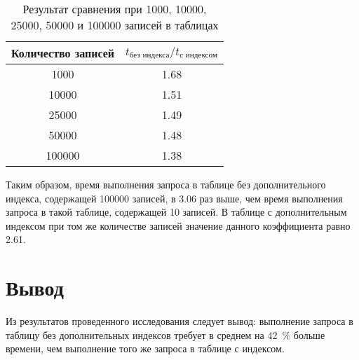 \begin{table}[h]
	\begin{center}
		\captionsetup{justification=raggedright,singlelinecheck=off}
		\caption{Результат сравнения при 1000, 10000, 25000, 50000 и 100000 записей в таблицах}
		\label{table:comparing}
		\begin{tabular}{|c|c|}
			\hline
			Количество записей & $t_{\text{без индекса}} / t_{\text{с индексом}}$ \\ \hline
			1000               & 1.68               \\ \hline
			10000              & 1.51               \\ \hline
			25000 			   & 1.49				\\ \hline 
			50000              & 1.48               \\ \hline
			100000             & 1.38               \\ \hline
		\end{tabular}
	\end{center}
\end{table}

\clearpage
Таким образом, время выполнения запроса в таблице без дополнительного индекса, содержащей 100000 записей, в 3.06 раз выше, чем время выполнения запроса в такой таблице, содержащей 10 записей.
В таблице с дополнительным индексом при том же количестве записей значение данного коэффициента равно 2.61.

\section*{Вывод}
Из результатов проведенного исследования следует вывод: выполнение запроса в таблицу без дополнительных индексов требует в среднем на 42~\% больше времени, чем выполнение того же запроса в таблице с индексом.

